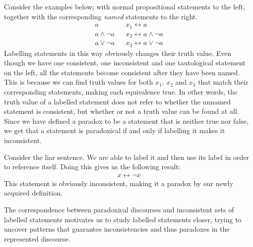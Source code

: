 Consider the examples below; with normal propositional statements to the left, together with the corresponding \textit{named} statements to the right.
\begin{align}
  a               && x_1 \leftrightarrow a\\
  a \wedge \neg a && x_2 \leftrightarrow a \wedge \neg a\\
  a \vee \neg a   && x_3 \leftrightarrow a \vee \neg a
\end{align}
Labelling statements in this way obviously changes their truth value.
Even though we have one consistent, one inconsistent and one tautological statement on the left, all the statements become consistent after they have been named.
This is because we can find truth values for both $x_1$, $x_2$ and $x_3$ that match their corresponding statements, making each equivalence true.
In other words, the truth value of a labelled statement does not refer to whether the unnamed statement is consistent, but whether or not a truth value can be found at all.
Since we have defined a paradox to be a statement that is neither true nor false, we get that a statement is paradoxical if and only if labelling it makes it inconsistent.

Consider the liar sentence.
We are able to label it and then use its label in order to reference itself.
Doing this gives us the following result:
\begin{align}
  x \leftrightarrow \neg x
\end{align}
This statement is obviously inconsistent, making it a paradox by our newly acquired definition.

The correspondence between paradoxical discourses and inconsistent sets of labelled statements motivates us to study labelled statements closer, trying to uncover patterns that guarantee inconsistencies and thus paradoxes in the represented discourse.
